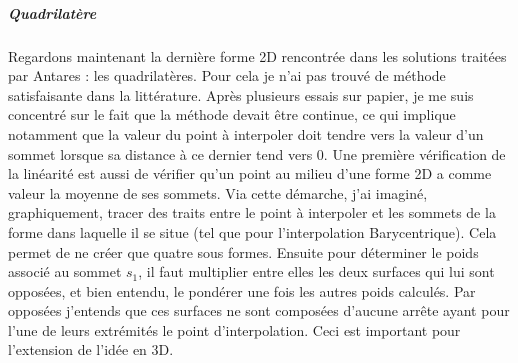 \subparagraph{Quadrilatère}

Regardons maintenant la dernière forme 2D rencontrée dans les solutions traitées par Antares : les quadrilatères.
Pour cela je n'ai pas trouvé de méthode satisfaisante dans la littérature.\cite{perronnet1998} Après plusieurs essais sur papier, je me suis concentré sur le fait que la méthode devait être continue, ce qui implique notamment que la valeur du point à interpoler doit tendre vers la valeur d'un sommet lorsque sa distance à ce dernier tend vers 0.
Une première vérification de la linéarité est aussi de vérifier qu'un point au milieu d'une forme 2D a comme valeur la moyenne de ses sommets.
Via cette démarche, j'ai imaginé, graphiquement, tracer des traits entre le point à interpoler et les sommets de la forme dans laquelle il se situe (tel que pour l'interpolation Barycentrique).
Cela permet de ne créer que quatre sous formes.
Ensuite pour déterminer le poids associé au sommet \( s_1 \), il faut multiplier entre elles les deux surfaces qui lui sont opposées, et bien entendu, le pondérer une fois les autres poids calculés.
Par opposées j'entends que ces surfaces ne sont composées d'aucune arrête ayant pour l'une de leurs extrémités le point d'interpolation. Ceci est important pour l'extension de l'idée en 3D.

